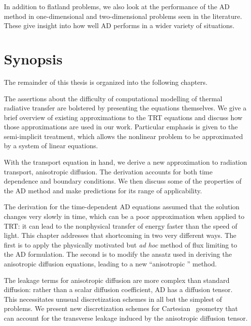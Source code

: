 In addition to flatland problems, we also look at the performance of the AD
method in one-dimensional and two-dimensional problems seen in the
literature. These give insight into how well AD performs in a wider variety of
situations.

\section{Synopsis}

The remainder of this thesis is organized into the following chapters.

The assertions about the difficulty of computational modelling of thermal
radiative transfer are bolstered by presenting the equations themselves. We give
a brief overview of existing approximations to the TRT equations and discuss how
those approximations are used in our work. Particular emphasis is given to the
semi-implicit treatment, which allows the nonlinear problem to be approximated
by a system of linear equations.

With the transport equation in hand, we derive a new approximation to radiation
transport, anisotropic diffusion. The derivation accounts for both time
dependence and boundary conditions. We then discuss some of the properties of
the AD method and make predictions for its range of applicability.

The derivation for the time-dependent AD equations assumed that the solution
changes very slowly in time, which can be a poor approximation when applied to
TRT: it can lead to the nonphysical transfer of energy faster than the speed of
light. This chapter addresses that shortcoming in two very different ways. The
first is to apply the physically motivated but \emph{ad hoc} method of flux
limiting to the AD formulation. The second is to modify the ansatz used in
deriving the anisotropic diffusion equations, leading to a new ``anisotropic
\Pone'' method.

The leakage terms for anisotropic diffusion are more complex than standard
diffusion: rather than a scalar diffusion coefficient, AD has a diffusion
tensor. This necessitates unusual discretization schemes in all but the simplest
of problems. We present new discretization schemes for Cartesian \xy\ geometry
that can account for the transverse leakage induced by the anisotropic diffusion
tensor.

